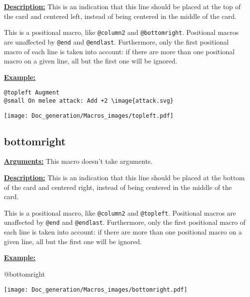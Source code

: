 \documentclass{article}
\begin{document}
\textbf{\underline{Description:}} This is an indication that this line should be placed at the top of the card and centered left, instead of being centered in the middle of the card.

This is a positional macro, like \verb`@column2` and \verb`@bottomright`. Positional macros are unaffected by \verb`@end` and \verb`@endlast`. Furthermore, only the first positional macro of each line is taken into account: if there are more than one positional macro on a given line, all but the first one will be ignored.

\textbf{\underline{Example:}}

\begin{center}
\begin{BVerbatim}
@topleft Augment
@small On melee attack: Add +2 \image{attack.svg}
\end{BVerbatim}

\texttt{[image: Doc\_generation/Macros\_images/topleft.pdf]}
\end{center}


\subsection{bottomright}
\textbf{\underline{Arguments:}} This macro doesn't take arguments.

\textbf{\underline{Description:}} This is an indication that this line should be placed at the bottom of the card and centered right, instead of being centered in the middle of the card.

This is a positional macro, like \verb`@column2` and \verb`@topleft`. Positional macros are unaffected by \verb`@end` and \verb`@endlast`. Furthermore, only the first positional macro of each line is taken into account: if there are more than one positional macro on a given line, all but the first one will be ignored.

\textbf{\underline{Example:}}

\begin{minipage}{0.45\linewidth}
\raggedright
\begin{spverbatim}
@bottomright 
\end{spverbatim}
\end{minipage}
\begin{minipage}{0.45\linewidth}
\raggedleft
\texttt{[image: Doc\_generation/Macros\_images/bottomright.pdf]}
\end{minipage} 
\end{document}
